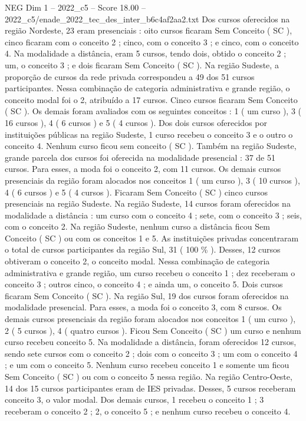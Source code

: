 \begin{textsample}{NEG Dim 1 – 2022\_c5 – Score 18.00 – 2022\_c5/enade\_2022\_tec\_des\_inter\_b6c4af2aa2.txt}
Dos cursos oferecidos na região Nordeste, 23 eram presenciais : oito cursos ficaram Sem Conceito ( SC ), cinco ficaram com o conceito 2 ; cinco, com o conceito 3 ; e cinco, com o conceito 4.
Na modalidade a distância, eram 5 cursos, tendo dois, obtido o conceito 2 ; um, o conceito 3 ; e dois ficaram Sem Conceito ( SC ).
Na região Sudeste, a proporção de cursos da rede privada correspondeu a 49 dos 51 cursos participantes.
Nessa combinação de categoria administrativa e grande região, o conceito modal foi o 2, atribuído a 17 cursos.
Cinco cursos ficaram Sem Conceito ( SC ).
Os demais foram avaliados com os seguintes conceitos : 1 ( um curso ), 3 ( 16 cursos ), 4 ( 6 cursos ) e 5 ( 4 cursos ).
Dos dois cursos oferecidos por instituições públicas na região Sudeste, 1 curso recebeu o conceito 3 e o outro o conceito 4.
Nenhum curso ficou sem conceito ( SC ).
Também na região Sudeste, grande parcela dos cursos foi oferecida na modalidade presencial : 37 de 51 cursos.
Para esses, a moda foi o conceito 2, com 11 cursos.
Os demais cursos presenciais da região foram alocados nos conceitos 1 ( um curso ), 3 ( 10 cursos ), 4 ( 6 cursos ) e 5 ( 4 cursos ).
Ficaram Sem Conceito ( SC ) cinco cursos presenciais na região Sudeste.
Na região Sudeste, 14 cursos foram oferecidos na modalidade a distância : um curso com o conceito 4 ; sete, com o conceito 3 ; seis, com o conceito 2.
Na região Sudeste, nenhum curso a distância ficou Sem Conceito ( SC ) ou com os conceitos 1 e 5.
As instituições privadas concentraram o total de cursos participantes da região Sul, 31 ( 100 \% ).
Desses, 12 cursos obtiveram o conceito 2, o conceito modal.
Nessa combinação de categoria administrativa e grande região, um curso recebeu o conceito 1 ; dez receberam o conceito 3 ; outros cinco, o conceito 4 ; e ainda um, o conceito 5.
Dois cursos ficaram Sem Conceito ( SC ).
Na região Sul, 19 dos cursos foram oferecidos na modalidade presencial.
Para esses, a moda foi o conceito 3, com 8 cursos.
Os demais cursos presenciais da região foram alocados nos conceitos 1 ( um curso ), 2 ( 5 cursos ), 4 ( quatro cursos ).
Ficou Sem Conceito ( SC ) um curso e nenhum curso recebeu conceito 5.
Na modalidade a distância, foram oferecidos 12 cursos, sendo sete cursos com o conceito 2 ; dois com o conceito 3 ; um com o conceito 4 ; e um com o conceito 5.
Nenhum curso recebeu conceito 1 e somente um ficou Sem Conceito ( SC ) ou com o conceito 5 nessa região.
Na região Centro-Oeste, 14 dos 15 cursos participantes eram de IES privadas.
Desses, 5 cursos receberam conceito 3, o valor modal.
Dos demais cursos, 1 recebeu o conceito 1 ; 3 receberam o conceito 2 ; 2, o conceito 5 ; e nenhum curso recebeu o conceito 4.

\end{textsample}
